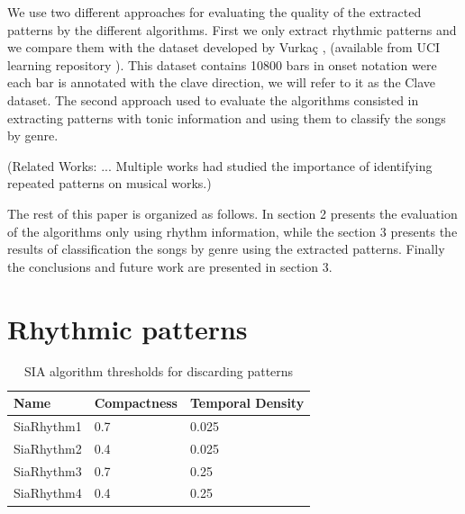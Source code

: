 \documentclass{article}
\begin{document}
We use two different approaches for evaluating the quality of the extracted patterns by the different algorithms. First we only extract rhythmic patterns and we compare them with the dataset developed by Vurkaç \cite{vurkac}, (available from UCI learning repository \cite{Lichman:2013}). This dataset contains 10800 bars in onset notation were each bar is annotated with the clave direction, we will refer to it as the Clave dataset. The second approach used to evaluate the algorithms consisted in extracting patterns with tonic information and using them to classify the songs by genre.

(Related Works: ...
Multiple works had studied the importance of identifying repeated patterns on musical works.)

The rest of this paper is organized as follows. In section 2 presents the evaluation of the algorithms only using rhythm information, while the section 3 presents the results of classification the songs by genre using the extracted patterns. Finally the conclusions and future work are presented in section 3. 

\section{Rhythmic patterns}

\begin{table}
 \begin{center}
 \begin{tabular}{|l|l|l|}
  \hline
  Name & Compactness & Temporal Density \\
  \hline
  SiaRhythm1 & 0.7 &0.025 \\
  \hline
  SiaRhythm2 & 0.4 & 0.025 \\
  \hline
  SiaRhythm3 & 0.7 & 0.25 \\
  \hline
  SiaRhythm4 & 0.4 & 0.25 \\
  \hline
 \end{tabular}
\end{center}
 \caption{SIA algorithm thresholds for discarding patterns}
 \label{siarhythm}
\end{table}
\end{document}
